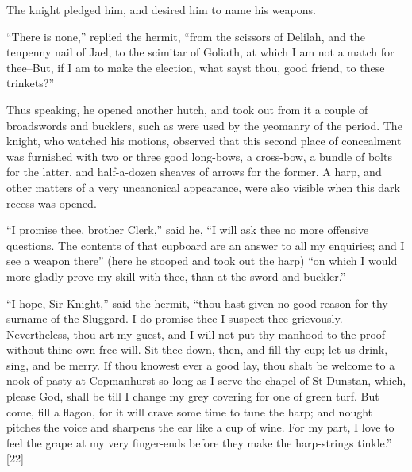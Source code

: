 The knight pledged him, and desired him to name his weapons.

``There is none,'' replied the hermit, ``from the scissors of Delilah,
and the tenpenny nail of Jael, to the scimitar of Goliath, at which I am
not a match for thee--But, if I am to make the election, what sayst
thou, good friend, to these trinkets?''

Thus speaking, he opened another hutch, and took out from it a couple of
broadswords and bucklers, such as were used by the yeomanry of the
period. The knight, who watched his motions, observed that this second
place of concealment was furnished with two or three good long-bows, a
cross-bow, a bundle of bolts for the latter, and half-a-dozen sheaves of
arrows for the former. A harp, and other matters of a very uncanonical
appearance, were also visible when this dark recess was opened.

``I promise thee, brother Clerk,'' said he, ``I will ask thee no more
offensive questions. The contents of that cupboard are an answer to all
my enquiries; and I see a weapon there'' (here he stooped and took out
the harp) ``on which I would more gladly prove my skill with thee, than
at the sword and buckler.''

``I hope, Sir Knight,'' said the hermit, ``thou hast given no good
reason for thy surname of the Sluggard. I do promise thee I suspect thee
grievously. Nevertheless, thou art my guest, and I will not put thy
manhood to the proof without thine own free will. Sit thee down, then,
and fill thy cup; let us drink, sing, and be merry. If thou knowest ever
a good lay, thou shalt be welcome to a nook of pasty at Copmanhurst so
long as I serve the chapel of St Dunstan, which, please God, shall be
till I change my grey covering for one of green turf. But come, fill a
flagon, for it will crave some time to tune the harp; and nought pitches
the voice and sharpens the ear like a cup of wine. For my part, I love
to feel the grape at my very finger-ends before they make the
harp-strings tinkle.'' {[}22{]}

